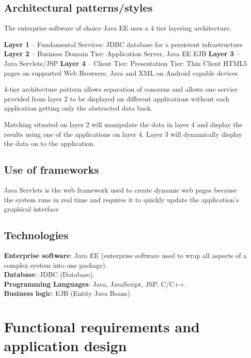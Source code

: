 \documentclass[12pt]{article}
\begin{document}
		\subsection{Architectural patterns/styles}	
			    The enterprise software of choice Java EE uses a 4 tier layering architecture.
			    
			    \textbf{Layer 1} – Fundamental Services: JDBC database for a persistent infrastructure
			    \textbf{Layer 2} – Business Domain Tier: Application Server, Java EE EJB
			    \textbf{Layer 3} – Java Servlets/JSP
			    \textbf{Layer 4} – Client Tier: Presentation Tier:  Thin Client HTML5 pages on supported Web Browsers, Java and XML on Android capable devices
			    
			    4-tier architecture pattern allows separation of concerns and allows one service provided from layer 2 to be displayed on different applications without each application getting only the abstracted data back.
			    
			    Matching situated on layer 2 will manipulate the data in layer 4 and display the results using one of the applications on layer 4. Layer 3 will dynamically display the data on to the application. 
			    	    	    
		\subsection{Use of frameworks}	
			Java Servlets is the web framework used to create dynamic web pages because the system runs in real time and requires it to quickly update the application’s graphical interface 
					    	
		\subsection{Technologies}	
				\textbf{Enterprise software}:  Java EE (enterprise software used to wrap all aspects of a complex system into one package).\\
				\textbf{Database}: JDBC (Database).\\
				\textbf{Programming Languages}: Java, JavaScript, JSP, C/C++.\\
				\textbf{Business logic}: EJB (Entity Java Beans)
					
					    		    		    			    	
	\section{Functional requirements and application design}
\end{document}
